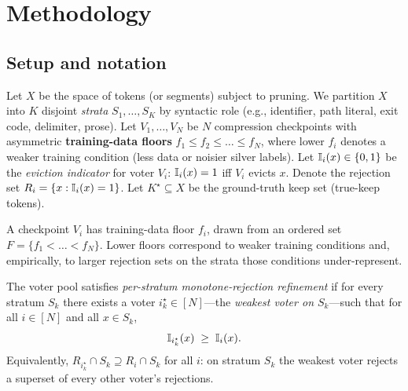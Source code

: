 \section{Methodology}
\label{sec:methodology}

\subsection{Setup and notation}
\label{sec:setup}

Let $X$ be the space of tokens (or segments) subject to pruning. We partition
$X$ into $K$ disjoint \emph{strata} $S_1,\dots,S_K$ by syntactic role
(e.g., identifier, path literal, exit code, delimiter, prose). Let
$V_1,\dots,V_N$ be $N$ compression checkpoints with asymmetric
\textbf{training-data floors} $f_1 \le f_2 \le \dots \le f_N$, where lower $f_i$
denotes a weaker training condition (less data or noisier silver labels).
Let $\mathbb{I}_i(x) \in \{0,1\}$ be the \emph{eviction indicator} for voter $V_i$:
$\mathbb{I}_i(x)=1$ iff $V_i$ evicts $x$. Denote the rejection set
$R_i = \{x : \mathbb{I}_i(x)=1\}$. Let $K^{\star}\subseteq X$ be the ground-truth
keep set (true-keep tokens).

\begin{definition}
\label{def:floor}
A checkpoint $V_i$ has training-data floor $f_i$, drawn from an ordered set
$F=\{f_1<\dots<f_N\}$. Lower floors correspond to weaker training conditions
and, empirically, to larger rejection sets on the strata those conditions
under-represent.
\end{definition}

\begin{definition}
\label{def:monotone}
The voter pool satisfies \emph{per-stratum monotone-rejection refinement} if
for every stratum $S_k$ there exists a voter $i^{\star}_k \in [N]$---the
\emph{weakest voter on $S_k$}---such that for all $i \in [N]$ and all
$x \in S_k$,
\[
  \mathbb{I}_{i^{\star}_k}(x) \;\ge\; \mathbb{I}_i(x).
\]
Equivalently, $R_{i^{\star}_k} \cap S_k \supseteq R_i \cap S_k$ for all $i$:
on stratum $S_k$ the weakest voter rejects a superset of every other voter's
rejections.
\end{definition}

